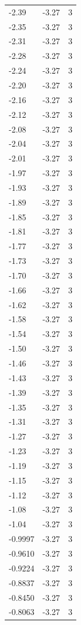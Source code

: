 \begin{longtable}{lrr}
  -2.39 & -3.27 & 3 \\
  -2.35 & -3.27 & 3 \\
  -2.31 & -3.27 & 3 \\
  -2.28 & -3.27 & 3 \\
  -2.24 & -3.27 & 3 \\
  -2.20 & -3.27 & 3 \\
  -2.16 & -3.27 & 3 \\
  -2.12 & -3.27 & 3 \\
  -2.08 & -3.27 & 3 \\
  -2.04 & -3.27 & 3 \\
  -2.01 & -3.27 & 3 \\
  -1.97 & -3.27 & 3 \\
  -1.93 & -3.27 & 3 \\
  -1.89 & -3.27 & 3 \\
  -1.85 & -3.27 & 3 \\
  -1.81 & -3.27 & 3 \\
  -1.77 & -3.27 & 3 \\
  -1.73 & -3.27 & 3 \\
  -1.70 & -3.27 & 3 \\
  -1.66 & -3.27 & 3 \\
  -1.62 & -3.27 & 3 \\
  -1.58 & -3.27 & 3 \\
  -1.54 & -3.27 & 3 \\
  -1.50 & -3.27 & 3 \\
  -1.46 & -3.27 & 3 \\
  -1.43 & -3.27 & 3 \\
  -1.39 & -3.27 & 3 \\
  -1.35 & -3.27 & 3 \\
  -1.31 & -3.27 & 3 \\
  -1.27 & -3.27 & 3 \\
  -1.23 & -3.27 & 3 \\
  -1.19 & -3.27 & 3 \\
  -1.15 & -3.27 & 3 \\
  -1.12 & -3.27 & 3 \\
  -1.08 & -3.27 & 3 \\
  -1.04 & -3.27 & 3 \\
  -0.9997 & -3.27 & 3 \\
  -0.9610 & -3.27 & 3 \\
  -0.9224 & -3.27 & 3 \\
  -0.8837 & -3.27 & 3 \\
  -0.8450 & -3.27 & 3 \\
  -0.8063 & -3.27 & 3 \\

\end{longtable}
